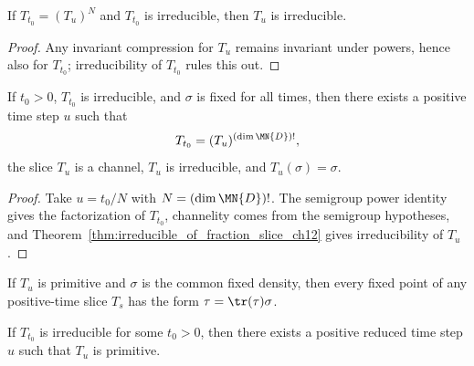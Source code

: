 \begin{theorem}
    \label{thm:irreducible_of_fraction_slice_ch12}
    \leanok
    If $T_{t_0} = (T_u)^N$ and $T_{t_0}$ is irreducible, then $T_u$ is irreducible.
\end{theorem}

\begin{proof}
    \leanok
    Any invariant compression for $T_u$ remains invariant under powers, hence also for
    $T_{t_0}$; irreducibility of $T_{t_0}$ rules this out.
\end{proof}

\begin{theorem}
    \label{thm:exists_irreducible_fraction_slice_ch12}
    \leanok
    If $t_0 > 0$, $T_{t_0}$ is irreducible, and $\sigma$ is fixed for all times,
    then there exists a positive time step $u$ such that
    \[
        T_{t_0} = (T_u)^{(\dim \MN{D})!},
    \]
    the slice $T_u$ is a channel, $T_u$ is irreducible, and $T_u(\sigma)=\sigma$.
\end{theorem}

\begin{proof}
    \leanok
    Take $u = t_0 / N$ with $N = (\dim \MN{D})!$. The semigroup power identity gives the
    factorization of $T_{t_0}$, channelity comes from the semigroup hypotheses, and
    Theorem~\ref{thm:irreducible_of_fraction_slice_ch12} gives irreducibility of $T_u$.
\end{proof}

\begin{theorem}
    \label{thm:fixedPoint_eq_trace_smul_of_primitive_slice_ch12}
    \leanok
    If $T_u$ is primitive and $\sigma$ is the common fixed density, then
    every fixed point of any positive-time slice $T_s$ has the form
    $\tau = \tr(\tau) \sigma$.
\end{theorem}

\begin{theorem}
    \label{thm:exists_primitive_fraction_slice_ch12}
    \leanok
    If $T_{t_0}$ is irreducible for some $t_0>0$, then there exists a
    positive reduced time step $u$ such that $T_u$ is primitive.
\end{theorem}


